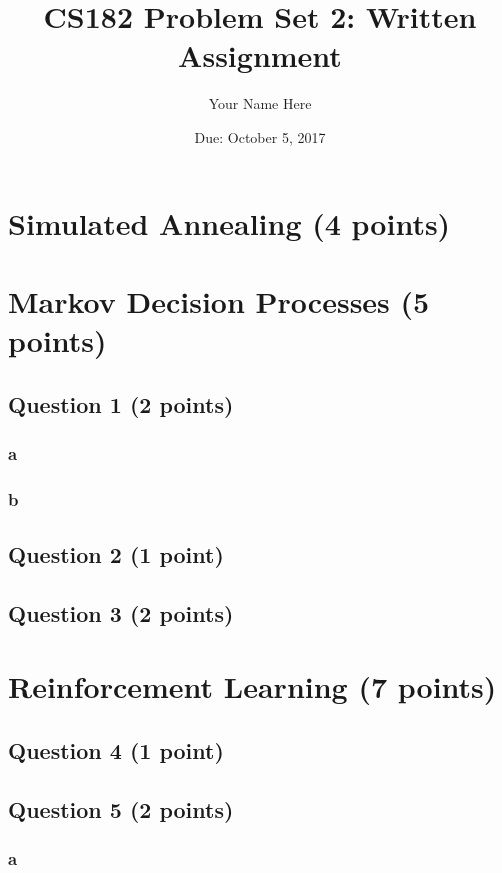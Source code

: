 \documentclass[11pt,letter]{article}
\begin{document}
\title{CS182 Problem Set 2: Written Assignment}
\author{Your Name Here}
\date{Due: October 5, 2017}
\maketitle 

\section*{Simulated Annealing (4 points)}

\section*{Markov Decision Processes (5 points)}

\subsection*{Question 1 (2 points)}
\subsubsection*{a}
\subsubsection*{b}

\subsection*{Question 2 (1 point)}

\subsection*{Question 3 (2 points)}

\section*{Reinforcement Learning (7 points)}

\subsection*{Question 4 (1 point)}

\subsection*{Question 5 (2 points)}
\subsubsection*{a}
\end{document}
